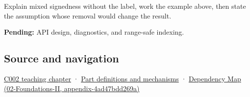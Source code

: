 Explain mixed signedness without the label, work the example above, then state the assumption whose removal would change the result.

\textbf{Pending:} API design, diagnostics, and range-safe indexing.

\subsection{Source and navigation}\label{source-and-navigation}

\href{Continuous\%20Notes/Computing\%20Foundations\%20-\%20From\%20Bits\%20to\%20C++\%20and\%20Systems\%20APIs\#Arithmetic\%20becomes\%20a\%20policy}{C002 teaching chapter} · \hyperref[appendix-fd090d982a15]{Part definitions and mechanisms} · \href{}{Dependency Map (02-Foundations-II, appendix-4ad47bdd269a)}
